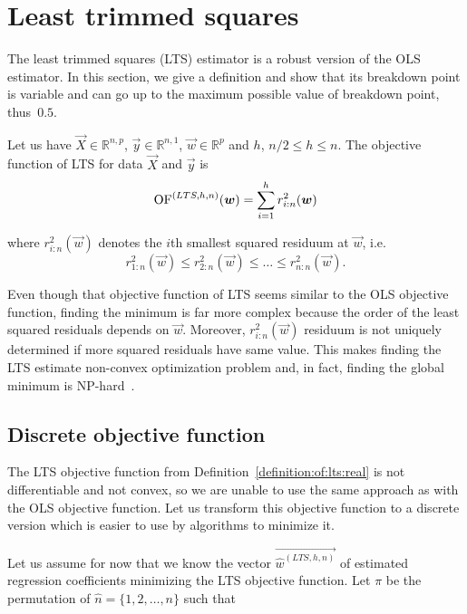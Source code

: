 \section{Least trimmed squares}
The least trimmed squares (LTS) estimator is a robust version of the OLS estimator. In this section, we give a definition and show that its breakdown point is variable and can go up to the maximum possible value of breakdown point, thus~$0.5$.

\begin{definition} \label{definition:of:lts:real}
Let us have $\vec{X} \in \mathbb{R}^{n,p}$, $\vec{y} \in \mathbb{R}^{n,1}$, 
    $\vec{w} \in \mathbb{R}^p$ and $h$, $ n/2 \leq h \leq n$. The objective function of LTS for data $\vec{X}$ and $\vec{y}$ is
    \begin{equation}  
        \operatorname{OF}^{(LTS,h, n)}(\boldsymbol{w}) =  \sum\limits_{i=1}^h r_{i:n}^2(\boldsymbol{w})  
    \end{equation}
\end{definition}
where $r_{i:n}^2(\vec{w})$ denotes the $i$th smallest squared residuum at $\vec{w}$, i.e. 
\begin{equation}
    r_{1:n}^2(\vec{w}) \leq r_{2:n}^2(\vec{w}) \leq \ldots \leq r_{n:n}^2(\vec{w}).   
\end{equation} 

Even though that objective function of LTS seems similar to the OLS objective function, finding the minimum is far more complex because the order of the least squared residuals depends on $\vec{w}$. Moreover, $r_{i:n}^2(\vec{w})$ residuum is not uniquely determined if more squared residuals have same value. This makes finding the LTS estimate non-convex optimization problem and, in fact, finding the global minimum is NP-hard~\cite{bernholt2006robust}. 

\subsection{Discrete objective function} \label{sectionofltsdiscrete}
The LTS objective function from Definition~\ref{definition:of:lts:real} is not differentiable and not convex, so we are unable to use the same approach as with the OLS objective function. Let us transform this objective function to a discrete version which is easier to use by algorithms to minimize it.

Let us assume for now that we know the vector $\vec{\hat{w}^{(LTS, h, n)}}$ of estimated regression coefficients minimizing the LTS objective function. Let $\pi$ be the permutation of $\hat{n} = \{{1,2,\ldots, n\}}$ such that 

